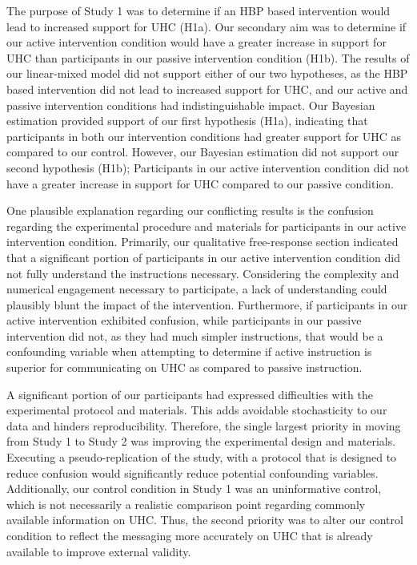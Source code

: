 \documentclass[
  english,
  man]{apa6}
\begin{document}
The purpose of Study 1 was to determine if an HBP based intervention would lead to increased support for UHC (H1a). Our secondary aim was to determine if our active intervention condition would have a greater increase in support for UHC than participants in our passive intervention condition (H1b). The results of our linear-mixed model did not support either of our two hypotheses, as the HBP based intervention did not lead to increased support for UHC, and our active and passive intervention conditions had indistinguishable impact. Our Bayesian estimation provided support of our first hypothesis (H1a), indicating that participants in both our intervention conditions had greater support for UHC as compared to our control. However, our Bayesian estimation did not support our second hypothesis (H1b); Participants in our active intervention condition did not have a greater increase in support for UHC compared to our passive condition.

One plausible explanation regarding our conflicting results is the confusion regarding the experimental procedure and materials for participants in our active intervention condition. Primarily, our qualitative free-response section indicated that a significant portion of participants in our active intervention condition did not fully understand the instructions necessary. Considering the complexity and numerical engagement necessary to participate, a lack of understanding could plausibly blunt the impact of the intervention. Furthermore, if participants in our active intervention exhibited confusion, while participants in our passive intervention did not, as they had much simpler instructions, that would be a confounding variable when attempting to determine if active instruction is superior for communicating on UHC as compared to passive instruction.

A significant portion of our participants had expressed difficulties with the experimental protocol and materials. This adds avoidable stochasticity to our data and hinders reproducibility. Therefore, the single largest priority in moving from Study 1 to Study 2 was improving the experimental design and materials. Executing a pseudo-replication of the study, with a protocol that is designed to reduce confusion would significantly reduce potential confounding variables. Additionally, our control condition in Study 1 was an uninformative control, which is not necessarily a realistic comparison point regarding commonly available information on UHC. Thus, the second priority was to alter our control condition to reflect the messaging more accurately on UHC that is already available to improve external validity.
\end{document}
